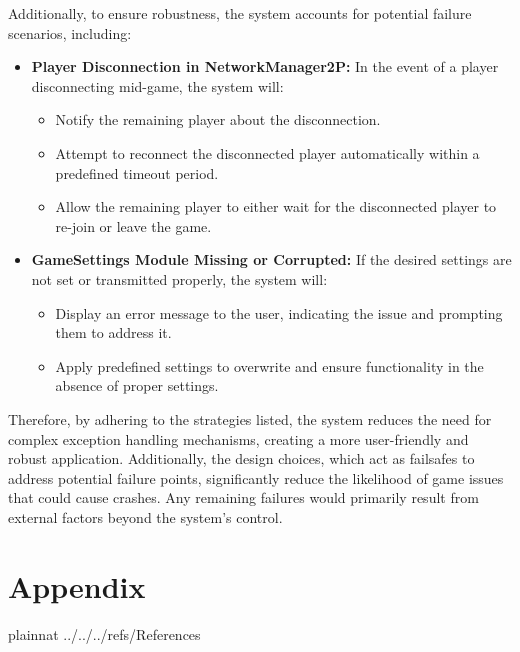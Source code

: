 \documentclass[12pt, titlepage]{article}
\begin{document}
Additionally, to ensure robustness, the system accounts for potential failure scenarios, including:

\begin{itemize}
	\item \textbf{Player Disconnection in NetworkManager2P: } 
	In the event of a player disconnecting mid-game, the system will:
	\begin{itemize}
		\item Notify the remaining player about the disconnection.
		\item Attempt to reconnect the disconnected player automatically within a predefined timeout period.
		\item Allow the remaining player to either wait for the disconnected player to re-join or leave the game.
	\end{itemize}
    \item \textbf{GameSettings Module Missing or Corrupted: } 
    If the desired settings are not set or transmitted properly, the system will:
    \begin{itemize}
        \item Display an error message to the user, indicating the issue and prompting them to address it.
        \item Apply predefined settings to overwrite and ensure functionality in the absence of proper settings.
    \end{itemize}
\end{itemize}

Therefore, by adhering to the strategies listed, the system reduces the need for complex exception handling mechanisms, creating a more user-friendly and robust application. Additionally, the design choices, which act as failsafes to address potential failure points, significantly reduce the likelihood of game issues that could cause crashes. Any remaining failures would primarily result from external factors beyond the system's control.



\newpage{}

\section{Appendix} \label{Appendix}


 {plainnat}
 {../../../refs/References}

\newpage{}
\end{document}
